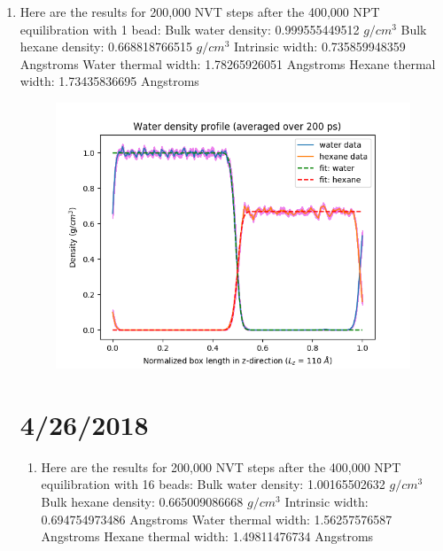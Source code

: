 \documentclass[12pt,reqno]{amsart}
\numberwithin{equation}{section}
\begin{document}
\begin{enumerate}
\item Here are the results for 200,000 NVT steps after the 400,000 NPT equilibration with 1 bead:
\subitem Bulk water density: 0.999555449512 $g/cm^3$
\subitem Bulk hexane density: 0.668818766515 $g/cm^3$
\subitem Intrinsic width: 0.735859948359 Angstroms
\subitem Water thermal width: 1.78265926051 Angstroms
\subitem Hexane thermal width: 1.73435836695 Angstroms

\begin{figure}[H]
\centering
\includegraphics[scale=0.4]{interface_density_profile_PI-1}
\end{figure}

\section{4/26/2018}

\begin{enumerate}
\item Here are the results for 200,000 NVT steps after the 400,000 NPT equilibration with 16 beads:
\subitem Bulk water density: 1.00165502632 $g/cm^3$
\subitem Bulk hexane density: 0.665009086668 $g/cm^3$
\subitem Intrinsic width: 0.694754973486 Angstroms
\subitem Water thermal width: 1.56257576587 Angstroms
\subitem Hexane thermal width: 1.49811476734 Angstroms
\end{enumerate}


\end{enumerate}
\end{document}
